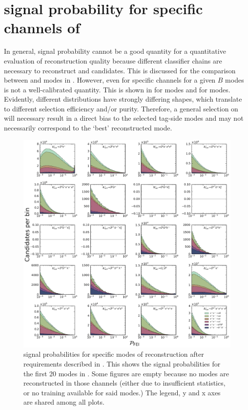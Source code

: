 \chapter{\texorpdfstring{\FEI}{FEI} signal probability for specific channels of \texorpdfstring{\B}{B}}\label{sec:appendix_fei_signal_probabilities}

In general, \FEI signal probability cannot be a good quantity for a quantitative evaluation of reconstruction quality because different classifier chains are necessary to reconstruct \Bp and \Bz candidates.
This is discussed for the comparison between \feiBp and \feiBz modes in .
However, even for specific channels for a given $B$ modes \feiProb is not a well-calibrated quantity.
This is shown in  for \Bp modes and  for \Bz modes.
Evidently, different distributions have strongly differing shapes, which translate to different selection efficiency and/or purity.
Therefore, a general selection on \feiProb will necessary result in a direct bias to the 
selected tag-side modes and may not necessarily correspond to the `best' reconstructed mode.

\begin{figure}[htbp!]

    \includegraphics[width=1\textwidth]{figures/appendices/FEI_signal_probabilities/Bp_feiSigProbs1.pdf}

    \caption{\label{fig:feisigprobs1} \FEI signal probabilities for specific modes of \Bp reconstruction after requirements described in .
    This shows the signal probabilities for the first 20 \Bp modes in .
    Some figures are empty because no modes are reconstructed in those channels (either due to insufficient statistics, or no training available for said modes.)
    The legend, y and x axes are shared among all plots.
    }
\end{figure}

